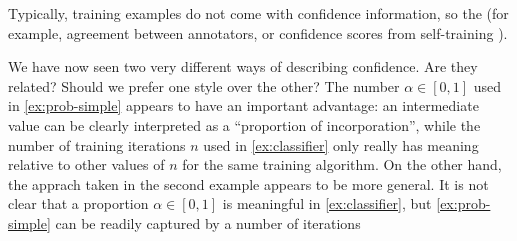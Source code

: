 \begin{example}
Typically, training examples do not come with confidence information,
so the 
(for example, agreement between annotators, or 
confidence scores from self-training \parencite{zou2019confidence}).
\end{example}

%
%
We have now seen two very different ways of describing confidence. 
Are they related? 
Should we prefer one style over the other?
The number $\alpha \in [0,1]$ used in \cref{ex:prob-simple}
appears to have an important advantage: an intermediate value can be clearly interpreted as a ``proportion of incorporation'', while the number of training iterations $n$ used in
\cref{ex:classifier} only really has meaning relative to
other values of $n$ for the same training algorithm.
%
On the other hand,
the apprach taken in the second example
appears to be more general. 
It is not clear that a proportion $\alpha \in [0,1]$ 
is meaningful in \cref{ex:classifier},
but \cref{ex:prob-simple} can be
readily captured by a number of iterations 
